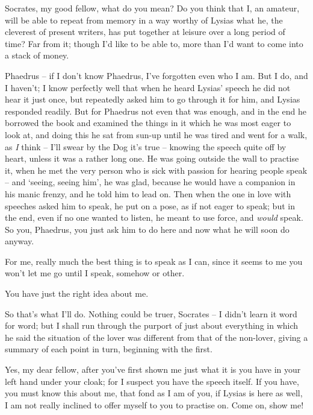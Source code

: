 Socrates, my good fellow, what do you mean? Do  you
think that I, an amateur, will be able to repeat from memory in a way
worthy of Lysias what he, the cleverest of present writers, has put
together at leisure over a long period of time? Far from it; though I'd
like to be able to, more than I'd want to come into a stack of money.

 Phaedrus -- if I don't know Phaedrus, I've forgotten
even who I am. But I do, and I haven't; I know perfectly well that when
he heard Lysias' speech he did not hear it just once, but repeatedly
asked him to go through it for him, and Lysias  responded
readily. But for Phaedrus not even that was enough, and in the end he
borrowed the book and examined the things in it which he was most eager
to look at, and doing this he sat from sun-up until he was tired and
went for a walk, as {\em I} think  -- I'll swear by the
Dog it's true -- knowing
the speech quite off by heart, unless it was a rather long one. He was
going outside the wall to practise it, when he met the very person who
is sick with passion for hearing people
speak -- and ‘seeing,
seeing him', he was glad,
because he would have a  companion in his manic frenzy, and he
told him to lead on. Then when the one in love with speeches asked him
to speak, he put on a pose, as if not eager to speak; but in the end,
even if no one wanted to listen, he meant to use force, and {\em would}
speak. So you, Phaedrus, you just ask him to do here and now 
what he will soon do anyway.

For me, really much the best thing is to speak as I can, since
it seems to me you won't let me go until I speak, somehow or other.

You have just the right idea about me.

So that's what I'll do. Nothing could be truer, 
Socrates -- I didn't learn it word for word; but I shall run through the
purport of just about everything in which he said the situation of the
lover was different from that of the non-lover, giving a summary of each
point in turn, beginning with  the first.

Yes, my dear fellow, after you've first shown me just what it
is you have in your left hand under your cloak; for I suspect you have
the speech itself. If you have, you must know this about me, that fond
as I am of you, if Lysias is here as well,  I am not really
inclined to offer myself to you to practise on. Come on, show me!

